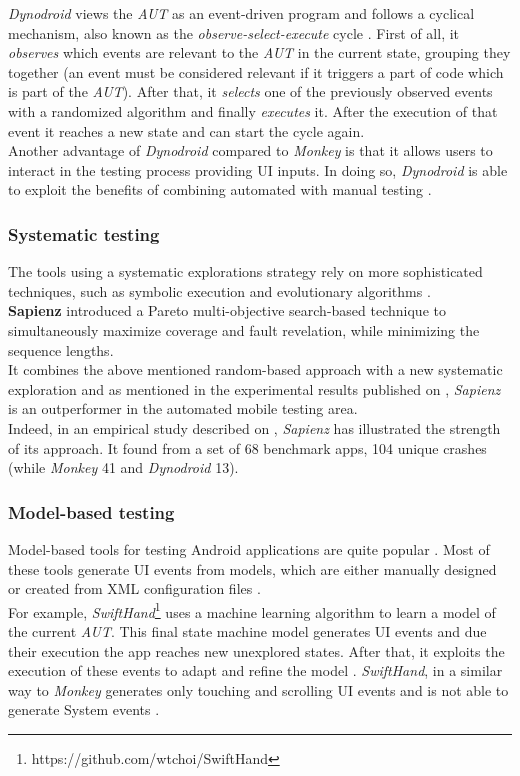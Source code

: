 \textit{Dynodroid }views the \textit{AUT} as an event-driven program and follows a cyclical mechanism, also known as the \textit{observe-select-execute} cycle \cite{dynodroid}. First of all, it \textit{observes} which events are relevant to the \textit{AUT} in the current state, grouping they together (an event must be considered relevant if it triggers a part of code which is part of the \textit{AUT}). After that, it \textit{selects} one of the previously observed events with a randomized algorithm \cite{dynodroid, areWeThereYet} and finally \textit{executes} it. After the execution of that event it reaches a new state and can start the cycle again. \\
Another advantage of \textit{Dynodroid} compared to \textit{Monkey} is that it allows users to interact in the testing process providing UI inputs. In doing so, \textit{Dynodroid} is able to exploit the benefits of combining automated with manual testing \cite{dynodroid}.

\subsubsection{Systematic testing}
The tools using a systematic explorations strategy rely on more sophisticated techniques, such as symbolic execution and evolutionary algorithms \cite{areWeThereYet}. \\
\textbf{Sapienz} \cite{sapienz} introduced a Pareto multi-objective search-based technique to simultaneously maximize coverage and fault revelation, while minimizing the sequence lengths. \\ It combines the above mentioned random-based approach with a new systematic exploration and as mentioned in the experimental results published on \cite{sapienz}, \textit{Sapienz} is an outperformer in the automated mobile testing area. \\
Indeed, in an empirical study described on \cite{sapienz}, \textit{Sapienz} has illustrated the strength of its approach. It found from a set of 68 benchmark apps, 104 unique crashes (while \textit{Monkey} 41 and \textit{Dynodroid} 13).

\subsubsection{Model-based testing}
Model-based tools for testing Android applications are quite popular \cite{sapienz}. Most of these tools \cite{mobiguitar,guiripper, swifthand, guidedgui, mining} generate UI events from models, which are either manually designed or created from XML configuration files \cite{sapienz}. \\
For example, \textit{SwiftHand}\footnote{https://github.com/wtchoi/SwiftHand} uses a machine learning algorithm to learn a model of the current \textit{AUT}. This final state machine model \cite{areWeThereYet} generates UI events and due their execution the app reaches new unexplored states. After that, it exploits the execution of these events to adapt and refine the model \cite{swifthand}. \textit{SwiftHand}, in a similar way to \textit{Monkey} generates only touching and scrolling UI events and is not able to generate System events \cite{areWeThereYet}.

